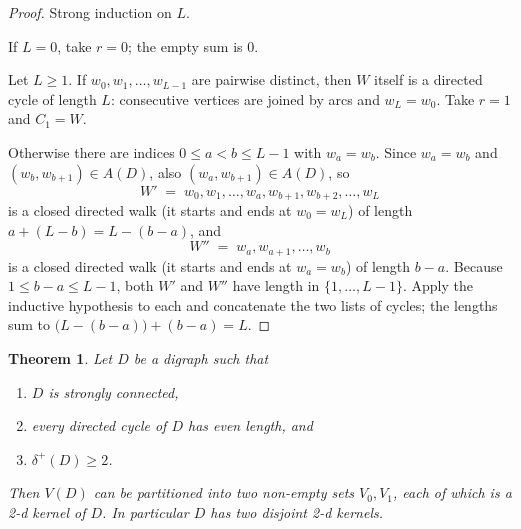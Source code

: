 \documentclass[11pt]{article}
\numberwithin{equation}{section}
\theoremstyle{plain}
\newtheorem{theorem}{Theorem}[section]
\newcommand{\V}{V}
\newcommand{\A}{A}
\newcommand{\dmin}{\delta^{+}}
\begin{document}
\begin{proof}
Strong induction on $L$.

If $L=0$, take $r=0$; the empty sum is $0$.

Let $L\ge 1$. If $w_0,w_1,\dots,w_{L-1}$ are pairwise distinct, then $W$ itself is a
directed cycle of length $L$: consecutive vertices are joined by arcs and $w_L=w_0$.
Take $r=1$ and $C_1=W$.

Otherwise there are indices $0\le a<b\le L-1$ with $w_a=w_b$. Since $w_a=w_b$ and
$(w_b,w_{b+1})\in\A(D)$, also $(w_a,w_{b+1})\in\A(D)$, so
\[
  W' \;=\; w_0,w_1,\dots,w_a,w_{b+1},w_{b+2},\dots,w_L
\]
is a closed directed walk (it starts and ends at $w_0=w_L$) of length $a+(L-b)=L-(b-a)$,
and
\[
  W'' \;=\; w_a,w_{a+1},\dots,w_b
\]
is a closed directed walk (it starts and ends at $w_a=w_b$) of length $b-a$. Because
$1\le b-a\le L-1$, both $W'$ and $W''$ have length in $\{1,\dots,L-1\}$. Apply the
inductive hypothesis to each and concatenate the two lists of cycles; the lengths sum to
$\bigl(L-(b-a)\bigr)+(b-a)=L$.
\end{proof}

\begin{theorem}\label{thm:B}
Let $D$ be a digraph such that
\begin{enumerate}[label=\textup{(\roman*)},leftmargin=2.6em]
\item $D$ is strongly connected,
\item every directed cycle of $D$ has even length, and
\item $\dmin(D)\ge 2$.
\end{enumerate}
Then $\V(D)$ can be partitioned into two non-empty sets $V_0,V_1$, each of which is a
2-d kernel of $D$. In particular $D$ has two disjoint 2-d kernels.
\end{theorem}
\end{document}
